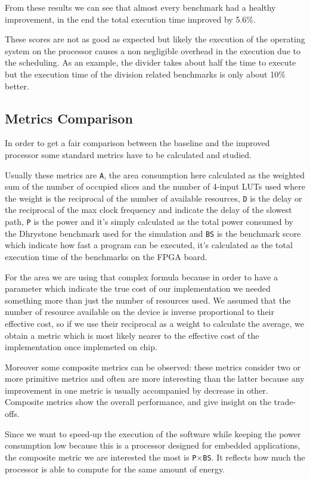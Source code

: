 From these results we can see that almost every benchmark had a healthy improvement, in the end
the total execution time improved by 5.6\%.

These scores are not as good as expected but likely the execution of the operating system
on the processor causes a non negligible overhead in the execution due to the scheduling. As an example, the
divider takes about half the time to execute but the execution time of the division related
benchmarks is only about 10\% better.

\subsection{Metrics Comparison}

In order to get a fair comparison between the baseline and the improved processor some standard
metrics have to be calculated and studied.

Usually these metrics are \texttt{A}, the area consumption here calculated as the weighted sum of the
number of occupied slices and the number of 4-input LUTs used where the weight is the reciprocal
of the number of available resources, \texttt{D} is the delay or the reciprocal of the max clock frequency
and indicate the delay of the slowest path, \texttt{P} is the power and it's simply calculated as the total
power consumed by the Dhrystone benchmark used for the simulation and \texttt{BS} is the benchmark
score which indicate how fast a program can be executed, it's calculated as the total execution
time of the benchmarks on the FPGA board.

For the area we are using that complex formula because in order to have a parameter which indicate the true cost of our implementation we needed something more than just the number of resources used.
We assumed that the number of resource available on the device is inverse proportional to their effective cost, so if we use their reciprocal as a weight to calculate the average, we obtain a metric which is most likely nearer to the effective cost of the implementation once implemeted on chip.

Moreover some composite metrics can be observed: these metrics consider two or more primitive
metrics and often are more interesting than the latter because any improvement in one metric is usually accompanied by decrease in other. Composite metrics show the overall performance, and give insight on the trade-offs.

Since we want to speed-up the execution of the software while keeping the power consumption
low because this is a processor designed for embedded applications, the composite metric we are
interested the most is \texttt{P$\times$BS}. It reflects how much the processor is able to compute for the same amount of energy.

